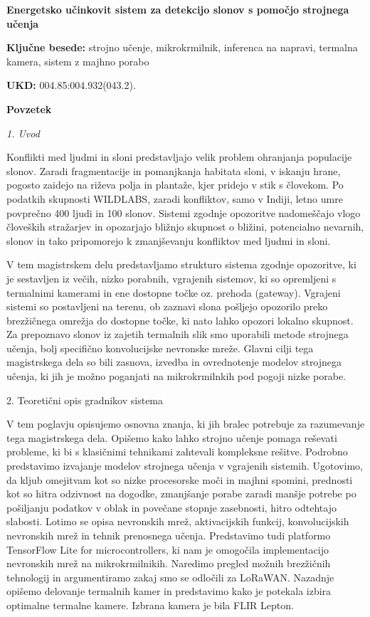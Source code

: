 \begin{poglavje}
\noindent\bfseries Energetsko učinkovit sistem za detekcijo slonov s pomočjo strojnega učenja
\end{poglavje}

\bigskip
\bigskip
\bigskip
\bigskip
\bigskip
\textbf{Ključne besede:} strojno učenje, mikrokrmilnik, inferenca na napravi, termalna kamera, sistem z majhno porabo

\bigskip
\textbf{UKD:} 004.85:004.932(043.2).

\bigskip
\bigskip
\bigskip
\bigskip
\textbf{Povzetek}
\newline
\newline
{\itshape
1. Uvod

Konflikti med ljudmi in sloni predstavljajo velik problem ohranjanja populacije slonov.
Zaradi fragmentacije in pomanjkanja habitata sloni, v iskanju hrane, pogosto zaidejo na riževa polja in plantaže, kjer pridejo v stik s človekom.
Po podatkih skupnosti WILDLABS, zaradi konfliktov, samo v Indiji, letno umre povprečno 400 ljudi in 100 slonov.
Sistemi zgodnje opozoritve nadomeščajo vlogo človeških stražarjev in opozarjajo bližnjo skupnost o bližini, potencialno nevarnih, slonov in tako pripomorejo k zmanjševanju konfliktov med ljudmi in sloni.

V tem magistrskem delu predstavljamo strukturo sistema zgodnje opozoritve, ki je sestavljen iz večih, nizko porabnih, vgrajenih sistemov, ki so opremljeni s termalnimi kamerami in ene dostopne točke oz. prehoda (gateway).
Vgrajeni sistemi so postavljeni na terenu, ob zaznavi slona pošljejo opozorilo preko brezžičnega omrežja do dostopne točke, ki nato lahko opozori lokalno skupnost.
Za prepoznavo slonov iz zajetih termalnih slik smo uporabili metode strojnega učenja, bolj specifično konvolucijske nevronske mreže.
Glavni cilji tega magistrskega dela so bili zasnova, izvedba in ovrednotenje modelov strojnega učenja, ki jih je možno poganjati na mikrokrmilnkih pod pogoji nizke porabe.

2. Teoretični opis gradnikov sistema

V tem poglavju opisujemo osnovna znanja, ki jih bralec potrebuje za razumevanje tega magistrskega dela.
Opišemo kako lahko strojno učenje pomaga reševati probleme, ki bi s klasičnimi tehnikami zahtevali kompleksne rešitve. 
Podrobno predstavimo izvajanje modelov strojnega učenja v vgrajenih sistemih.
Ugotovimo, da kljub omejitvam kot so nizke procesorske moči in majhni spomini, prednosti kot so hitra odzivnost na dogodke, zmanjšanje porabe zaradi manšje potrebe po pošiljanju podatkov v oblak in povečane stopnje zasebnosti, hitro odtehtajo slabosti.
Lotimo se opisa nevronskih mrež, aktivacijskih funkcij, konvolucijskih nevronskih mrež in tehnik prenosnega učenja.
Predstavimo tudi platformo TensorFlow Lite for microcontrollers, ki nam je omogočila implementacijo nevronskih mrež na mikrokrmilnikih.
Naredimo pregled možnih brezžičnih tehnologij in argumentiramo zakaj smo se odločili za LoRaWAN.
Nazadnje opišemo delovanje termalnih kamer in predstavimo kako je potekala izbira optimalne termalne kamere.
Izbrana kamera je bila FLIR Lepton.
\newline

}
